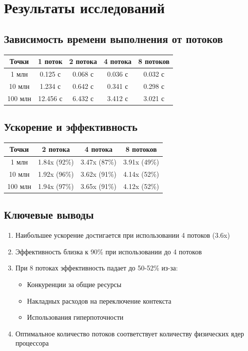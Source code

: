 \section{Результаты исследований}

\subsection{Зависимость времени выполнения от потоков}
\begin{center}
\begin{tabular}{|c|c|c|c|c|}
\hline
\textbf{Точки} & \textbf{1 поток} & \textbf{2 потока} & \textbf{4 потока} & \textbf{8 потоков} \\
\hline
1 млн & 0.125 с & 0.068 с & 0.036 с & 0.032 с \\
10 млн & 1.234 с & 0.642 с & 0.341 с & 0.298 с \\
100 млн & 12.456 с & 6.432 с & 3.412 с & 3.021 с \\
\hline
\end{tabular}
\end{center}

\subsection{Ускорение и эффективность}
\begin{center}
\begin{tabular}{|c|c|c|c|}
\hline
\textbf{Точки} & \textbf{2 потока} & \textbf{4 потока} & \textbf{8 потоков} \\
\hline
1 млн & 1.84x (92\%) & 3.47x (87\%) & 3.91x (49\%) \\
10 млн & 1.92x (96\%) & 3.62x (91\%) & 4.14x (52\%) \\
100 млн & 1.94x (97\%) & 3.65x (91\%) & 4.12x (52\%) \\
\hline
\end{tabular}
\end{center}

\subsection{Ключевые выводы}
\begin{enumerate}
    \item Наибольшее ускорение достигается при использовании 4 потоков (3.6x)
    \item Эффективность близка к 90\% при использовании до 4 потоков
    \item При 8 потоках эффективность падает до 50-52\% из-за:
    \begin{itemize}
        \item Конкуренции за общие ресурсы
        \item Накладных расходов на переключение контекста
        \item Использования гиперпоточности
    \end{itemize}
    \item Оптимальное количество потоков соответствует количеству физических ядер процессора
\end{enumerate}
